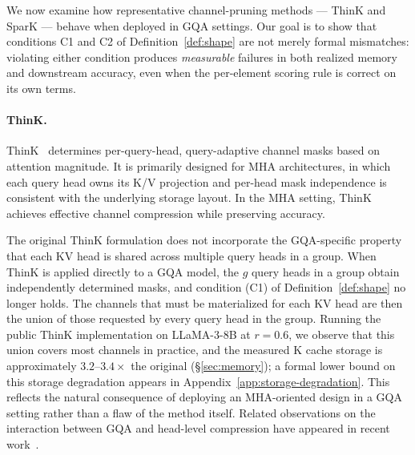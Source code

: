\documentclass{article}
\begin{document}
We now examine how representative channel-pruning methods --- ThinK and SparK --- behave when deployed in GQA settings. Our goal is to show that conditions C1 and C2 of Definition~\ref{def:shape} are not merely formal mismatches: violating either condition produces \emph{measurable} failures in both realized memory and downstream accuracy, even when the per-element scoring rule is correct on its own terms.
 
\paragraph{ThinK.} ThinK~\citep{think} determines per-query-head, query-adaptive channel masks based on attention magnitude. It is primarily designed for MHA architectures, in which each query head owns its K/V projection and per-head mask independence is consistent with the underlying storage layout. In the MHA setting, ThinK achieves effective channel compression while preserving accuracy.
 
The original ThinK formulation does not incorporate the GQA-specific property that each KV head is shared across multiple query heads in a group. When ThinK is applied directly to a GQA model, the $g$ query heads in a group obtain independently determined masks, and condition (C1) of Definition~\ref{def:shape} no longer holds. The channels that must be materialized for each KV head are then the union of those requested by every query head in the group. Running the public ThinK implementation on LLaMA-3-8B at $r = 0.6$, we observe that this union covers most channels in practice, and the measured K cache storage is approximately $3.2$--$3.4\times$ the original (\S\ref{sec:memory}); a formal lower bound on this storage degradation appears in Appendix~\ref{app:storage-degradation}. This reflects the natural consequence of deploying an MHA-oriented design in a GQA setting rather than a flaw of the method itself. Related observations on the interaction between GQA and head-level compression have appeared in recent work~\citep{adakv, twilight}.
 
\end{document}
